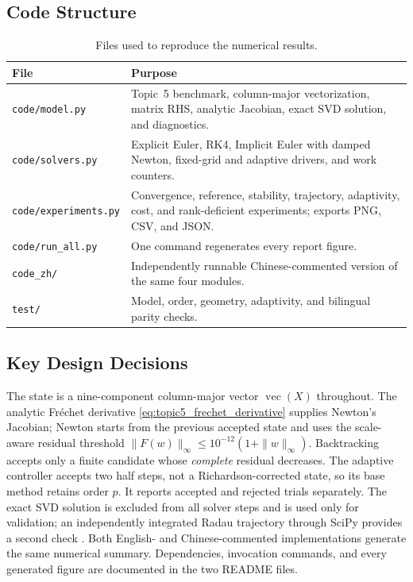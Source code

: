 \documentclass[11pt,a4paper]{article}
\theoremstyle{definition}
\theoremstyle{remark}
\begin{document}
\subsection{Code Structure}
\begin{table}[H]
\centering
\begin{tabular}{lp{}}
\toprule
\textbf{File} & \textbf{Purpose} \\
\midrule
\texttt{code/model.py} & Topic~5 benchmark, column-major vectorization,
  matrix RHS, analytic Jacobian, exact SVD solution, and diagnostics. \\
\texttt{code/solvers.py} & Explicit Euler, RK4, Implicit Euler with
  damped Newton, fixed-grid and adaptive drivers, and work counters. \\
\texttt{code/experiments.py} & Convergence, reference, stability,
  trajectory, adaptivity, cost, and rank-deficient experiments;
  exports PNG, CSV, and JSON. \\
\texttt{code/run\_all.py} & One command regenerates every report figure. \\
\texttt{code\_zh/} & Independently runnable Chinese-commented version of
  the same four modules. \\
\texttt{test/} & Model, order, geometry, adaptivity, and bilingual
  parity checks. \\
\bottomrule
\end{tabular}
\caption{Files used to reproduce the numerical results.}
\label{tab:code_structure}
\end{table}

\subsection{Key Design Decisions}
The state is a nine-component column-major vector
$\operatorname{vec}(X)$ throughout. The analytic Fr\'echet derivative
\eqref{eq:topic5_frechet_derivative} supplies Newton's Jacobian;
Newton starts from the previous accepted state and uses the
scale-aware residual threshold
$\|F(w)\|_\infty\leq10^{-12}(1+\|w\|_\infty)$.
Backtracking accepts only a finite candidate whose \emph{complete}
residual decreases. The adaptive controller accepts two half steps,
not a Richardson-corrected state, so its base method retains order
$p$. It reports accepted and rejected trials separately. The exact
SVD solution is excluded from all solver steps and is used only for
validation; an independently integrated Radau trajectory through
SciPy provides a second check \cite{virtanen2020}. Both English- and Chinese-commented implementations
generate the same numerical summary. Dependencies, invocation
commands, and every generated figure are documented in the two
README files.
\end{document}

